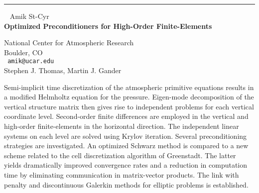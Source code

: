 \documentclass{report}
\begin{document}
\begin{center}

\rule{6in}{1pt} \
{\large
Amik St-Cyr
\\ {\bf
Optimized Preconditioners for High-Order Finite-Elements
}}

National Center for Atmospheric Research \\ Boulder, CO
\\ {\tt
amik@ucar.edu
}
\\

Stephen J. Thomas,
Martin J. Gander
\end{center}

Semi-implicit time discretization of the atmospheric primitive
equations results in a modified Helmholtz equation for the pressure.
Eigen-mode decomposition of the vertical structure matrix then gives
rise to independent problems for each vertical coordinate level.
Second-order finite differences are employed in the vertical and
high-order finite-elements in the horizontal direction. The independent
linear systems on each level are solved using Krylov iteration. Several
preconditioning strategies are investigated. An optimized Schwarz
method is compared to a new scheme related to the cell discretization
algorithm of Greenstadt. The latter yields dramatically improved
convergence rates and a reduction in computation time by eliminating
communication in matrix-vector products. The link with penalty and
discontinuous Galerkin methods for elliptic problems is established.
\end{document}
